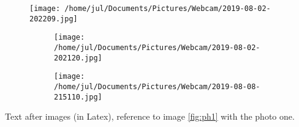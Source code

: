 \documentclass{article}
\begin{document}
    \begin{figure}[b!]
        \texttt{[image: /home/jul/Documents/Pictures/Webcam/2019-08-02-202209.jpg]}
        \caption{photo1}
        \label{fig:ph1}

        \begin{subfigure}{0.2\linewidth}
            \texttt{[image: /home/jul/Documents/Pictures/Webcam/2019-08-02-202120.jpg]}
        \end{subfigure}
        \begin{subfigure}{0.2\linewidth}
            \texttt{[image: /home/jul/Documents/Pictures/Webcam/2019-08-08-215110.jpg]}
        \end{subfigure}
    \end{figure}

Text after images (in Latex), reference to image \ref{fig:ph1} with the photo
one.
\end{document}
